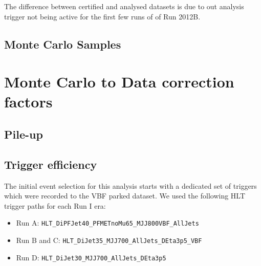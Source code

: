 

The difference between certified and analysed datasets is due to out analysis trigger not being active for the first few runs of of Run 2012B. 

\subsection{Monte Carlo Samples}


\section{Monte Carlo to Data correction factors}

\subsection{Pile-up}

\subsection{Trigger efficiency}
\label{SUBSECTION:ParkedDataAnalysis_CorrectionFactors_TriggerEfficiency}


The initial event selection for this analysis starts with a dedicated set of triggers which were recorded to the \gls{VBF} parked dataset. We used the following \gls{HLT} trigger paths for each Run I era:

\begin{itemize}
  \item Run A:       \verb!HLT_DiPFJet40_PFMETnoMu65_MJJ800VBF_AllJets!
  \item Run B and C: \verb!HLT_DiJet35_MJJ700_AllJets_DEta3p5_VBF!
  \item Run D:       \verb!HLT_DiJet30_MJJ700_AllJets_DEta3p5!
\end{itemize}

